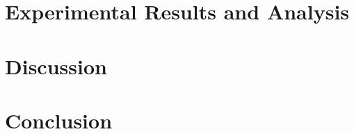 \documentclass[10pt,a4paper]{article}
\begin{document}
\section{Experimental Results and Analysis}\label{sec:results}

\section{Discussion}\label{sec:discussion}

\section{Conclusion}\label{sec:conclusion}



\end{document}
